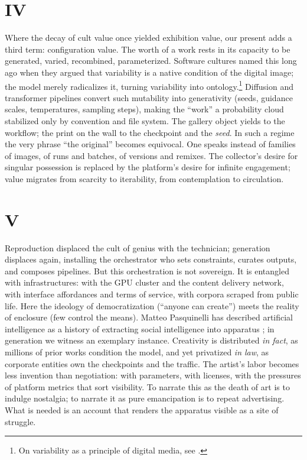 \documentclass[12pt]{article}
\begin{document}
\section*{IV}

Where the decay of cult value once yielded exhibition value, our present adds a third term: configuration value. The worth of a work rests in its capacity to be generated, varied, recombined, parameterized. Software cultures named this long ago when they argued that variability is a native condition of the digital image; the model merely radicalizes it, turning variability into ontology.\footnote{On variability as a principle of digital media, see \autocite{Manovich2001}.} Diffusion and transformer pipelines convert such mutability into generativity (seeds, guidance scales, temperatures, sampling steps), making the ``work'' a probability cloud stabilized only by convention and file system. The gallery object yields to the workflow; the print on the wall to the checkpoint and the \emph{seed}. In such a regime the very phrase ``the original'' becomes equivocal. One speaks instead of families of images, of runs and batches, of versions and remixes. The collector's desire for singular possession is replaced by the platform's desire for infinite engagement; value migrates from scarcity to iterability, from contemplation to circulation.

\section*{V}

Reproduction displaced the cult of genius with the technician; generation displaces again, installing the orchestrator who sets constraints, curates outputs, and composes pipelines. But this orchestration is not sovereign. It is entangled with infrastructures: with the GPU cluster and the content delivery network, with interface affordances and terms of service, with corpora scraped from public life. Here the ideology of democratization (``anyone can create'') meets the reality of enclosure (few control the means). Matteo Pasquinelli has described artificial intelligence as a history of extracting social intelligence into apparatus \autocite{Pasquinelli2023}; in generation we witness an exemplary instance. Creativity is distributed \emph{in fact}, as millions of prior works condition the model, and yet privatized \emph{in law}, as corporate entities own the checkpoints and the traffic. The artist's labor becomes less invention than negotiation: with parameters, with licenses, with the pressures of platform metrics that sort visibility. To narrate this as the death of art is to indulge nostalgia; to narrate it as pure emancipation is to repeat advertising. What is needed is an account that renders the apparatus visible as a site of struggle.
\end{document}
